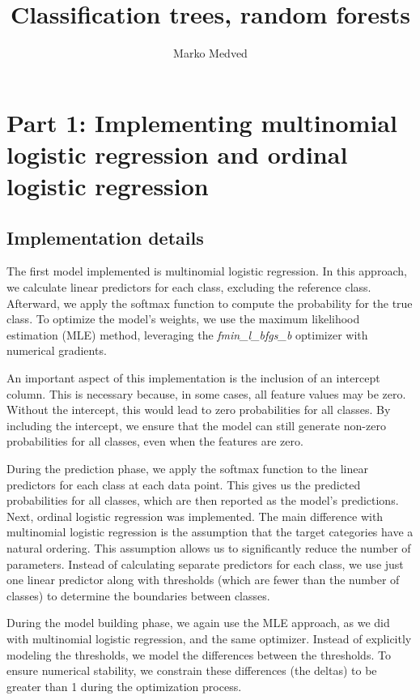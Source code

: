 \documentclass[9pt]{IEEEtran}
\title{\vspace{0ex}
Classification trees, random forests}
\author{Marko Medved\vspace{-4.0ex}}
\begin{document}
\maketitle

\section{Part 1: Implementing multinomial logistic regression and ordinal logistic regression }
\subsection{Implementation details}
The first model implemented is multinomial logistic regression. 
In this approach, we calculate linear predictors for each class, 
excluding the reference class. Afterward, we apply the softmax function
 to compute the probability for the true class. To optimize the model’s 
 weights, we use the maximum likelihood estimation (MLE) method, leveraging 
 the \textit{fmin\_l\_bfgs\_b} optimizer with numerical gradients.
 
An important aspect of this implementation is the inclusion of an 
intercept column. This is necessary because, in some cases, all feature 
values may be zero. Without the intercept, this would lead to zero
 probabilities for all classes. By including the intercept, we ensure 
 that the model can still generate non-zero probabilities for all classes,
  even when the features are zero.

During the prediction phase, we apply the softmax function to the
 linear predictors for each class at each data point. This gives us 
 the predicted probabilities for all classes, which are then reported as
  the model's predictions.  \\

  Next, ordinal logistic regression was implemented. The main difference
   with multinomial logistic regression is the assumption that the target 
   categories have a natural ordering. This assumption allows us to 
   significantly reduce the number of parameters. Instead of calculating
    separate predictors for each class, we use just one linear predictor 
    along with thresholds (which are fewer than the number of classes) to
     determine the boundaries between classes.

  During the model building phase, we again use the MLE approach, as we did with multinomial 
  logistic regression, and the same optimizer. Instead of 
  explicitly modeling the thresholds, we model the differences between
   the thresholds. To ensure numerical stability, we constrain
    these differences (the deltas) to be greater than 1 during the
     optimization process.
  
\end{document}
